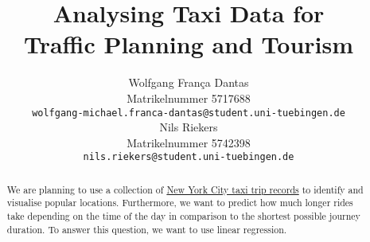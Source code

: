 \documentclass{article}
\title{Analysing Taxi Data for\\ Traffic Planning and Tourism}
\author{%
  Wolfgang França Dantas\\
  Matrikelnummer 5717688\\
  \texttt{wolfgang-michael.franca-dantas@student.uni-tuebingen.de} \\
  \And
  Nils Riekers\\
  Matrikelnummer 5742398\\
  \texttt{nils.riekers@student.uni-tuebingen.de} \\
}
\begin{document}
\maketitle

\begin{abstract}
    We are planning to use a collection of \href{https://www1.nyc.gov/site/tlc/about/tlc-trip-record-data.page}{New York City taxi trip records} to identify and visualise popular locations. Furthermore, we want to predict how much longer rides take depending on the time of the day in comparison to the shortest possible journey duration. To answer this question, we want to use linear regression.
\end{abstract}
\end{document}
